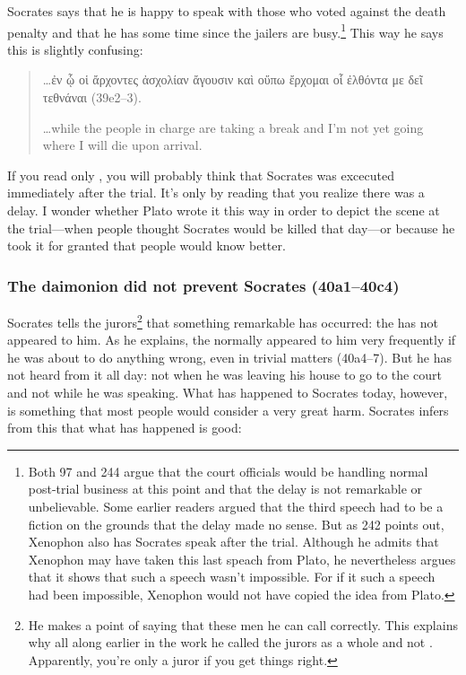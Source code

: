 \documentclass[11pt]{article}
\begin{document}
Socrates says that he is happy to speak with those who voted against the death
penalty and that he has some time since the jailers are busy.\footnote{Both
\citet{adam1914} 97 and \citet{burnet1924} 244 argue that the court officials
would be handling normal post-trial business at this point and that the delay
is not remarkable or unbelievable.  Some earlier readers argued that the third
speech had to be a fiction on the grounds that the delay made no sense.  But as
\citet{burnet1924} 242 points out, Xenophon also has Socrates speak after the
trial.  Although he admits that Xenophon may have taken this last speach from
Plato, he nevertheless argues that it shows that such a speech wasn't
impossible.  For if it such a speech had been impossible, Xenophon would not
have copied the idea from Plato.}  This way he says this is slightly confusing:

\begin{quote}
    \dots {\g ἐν ᾧ οἱ ἄρχοντες ἀσχολίαν ἄγουσιν καὶ οὔπω ἔρχομαι οἷ ἐλθόντα με
    δεῖ τεθνάναι} (39e2--3).

    \dots while the people in charge are taking a break and I'm not yet going
    where I will die upon arrival.
\end{quote}

If you read only , you will probably think that Socrates was
excecuted immediately after the trial.  It's only by reading  that
you realize there was a delay.  I wonder whether Plato wrote it this way in
order to depict the scene at the trial---when people thought Socrates would be
killed that day---or because he took it for granted that people would know
better.

\subsubsection{The daimonion did not prevent Socrates (40a1--40c4)}

Socrates tells the jurors\footnote{He makes a point of saying that these men he
can call  correctly.  This explains why all along earlier in the
work he called the jurors as a whole  and not
.  Apparently, you're only a juror if you get things right.} that
something remarkable has occurred: the  has not appeared to
him.  As he explains, the  normally appeared to him very
frequently if he was about to do anything wrong, even in trivial matters
(40a4--7).  But he has not heard from it all day: not when he was leaving his
house to go to the court and not while he was speaking.  What has happened to
Socrates today, however, is something that most people would consider a very
great harm.  Socrates infers from this that what has happened is good:
\end{document}
